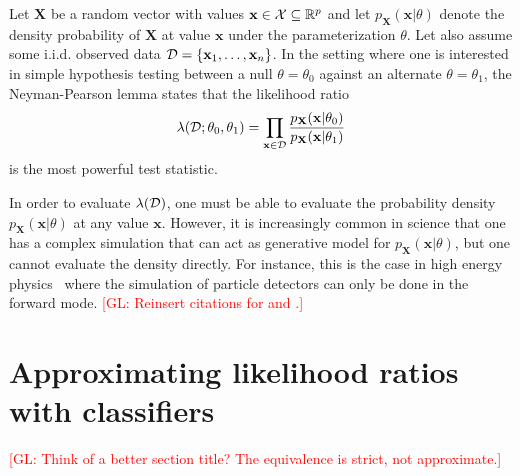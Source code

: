 \documentclass[12pt]{article}
\numberwithin{equation}{section}
\theoremstyle{plain}
\newcommand{\glnote}[1]{\textcolor{red}{[GL: #1]}}
\begin{document}
Let $\mathbf{X}$ be a random vector with values $\mathbf{x} \in {\cal X}
\subseteq \mathbb{R}^p$ and let $p_\mathbf{X}(\mathbf{x}|\theta)$ denote the
density probability of $\mathbf{X}$ at value $\mathbf{x}$ under the
parameterization $\theta$. Let also assume some i.i.d. observed data ${\cal D} = \{
\mathbf{x}_1, \dots, \mathbf{x}_n \}$. In the setting where one is interested in
simple hypothesis testing between a null $\theta=\theta_0$ against an alternate
$\theta=\theta_1$, the Neyman-Pearson lemma states that the likelihood ratio
\begin{equation}\label{eqn:likelihood-ratio-test}
\lambda({\cal D}; \theta_0, \theta_1) = \prod_{\mathbf{x} \in {\cal D}} \frac{ p_\mathbf{X}(\mathbf{x}|\theta_0)}{ p_\mathbf{X}(\mathbf{x}|\theta_1)}
\end{equation}
is the most powerful test statistic.

In order to evaluate $\lambda({\cal D})$, one must be able to evaluate the probability
density $p_\mathbf{X}(\mathbf{x}| \theta)$ at any value $\mathbf{x}$. However,
it is increasingly common in science that one has a complex simulation that can
act as generative model for $p_\mathbf{X}(\mathbf{x}|\theta)$, but one cannot
evaluate the density directly. For instance, this is the case in high energy
physics~\citep{Neal:2007zz} where the simulation of particle detectors can only
be done in the forward mode. \glnote{Reinsert citations for \cite{ClaytonScott}
and \cite{JMLR:v14:tong13a}.}




\section{Approximating likelihood ratios with classifiers}
\label{sec:approx}

\glnote{Think of a better section title? The equivalence is strict, not approximate.}
\end{document}
